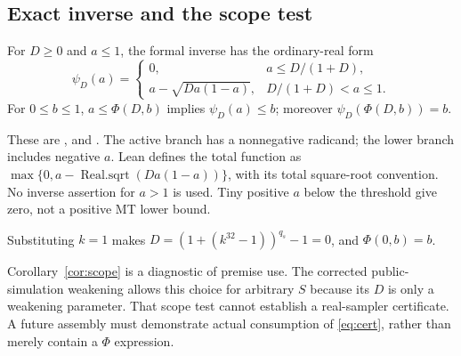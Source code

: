 \subsection{Exact inverse and the scope test}
\begin{theorem}\label{thm:inverse}
For $D\geq0$ and $a\leq1$, the formal inverse has the ordinary-real form
\begin{equation}\label{eq:psi}
 \psi_D(a)=\begin{cases}
 0,& a\leq D/(1+D),\\
 a-\sqrt{Da(1-a)},&D/(1+D)<a\leq1.
 \end{cases}
\end{equation}
For $0\leq b\leq1$, $a\leq\Phi(D,b)$ implies $\psi_D(a)\leq b$;
moreover $\psi_D(\Phi(D,b))=b$.
\end{theorem}
These are ,  and
. The active branch has a nonnegative radicand;
the lower branch includes negative $a$. Lean defines the total function
as $\max\{0,a-\operatorname{Real.sqrt}(Da(1-a))\}$, with its total
square-root convention. No inverse assertion for $a>1$ is used.
Tiny positive $a$ below the threshold give zero, not a positive
MT lower bound.

\begin{corollary}[Scope test: $k=1$]\label{cor:scope}
Substituting $k=1$ makes $D=(1+(k^{32}-1))^{q_s}-1=0$, and
$\Phi(0,b)=b$.
\end{corollary}
Corollary~\ref{cor:scope} is a diagnostic of premise use. The corrected
public-simulation weakening allows this
choice for arbitrary $S$ because its $D$ is only a weakening parameter.
That scope test cannot establish a real-sampler certificate. A future
assembly must demonstrate actual consumption of \eqref{eq:cert}, rather
than merely contain a $\Phi$ expression.
